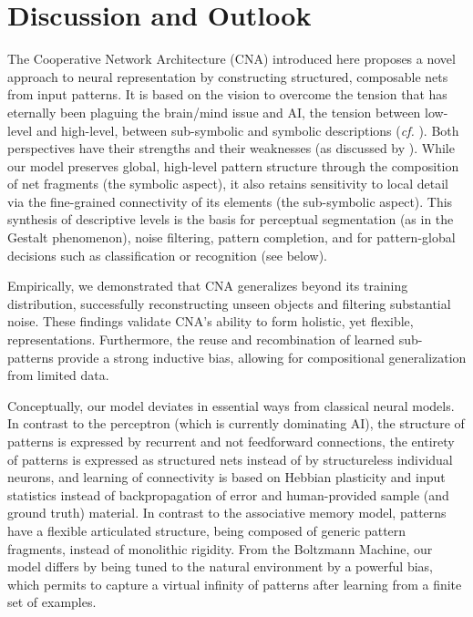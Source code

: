 \documentclass[12pt]{article}
\begin{document}
\section{Discussion and Outlook}\label{sec:discussion}
The Cooperative Network Architecture (CNA) introduced here proposes a novel approach to neural representation by constructing structured, composable nets from input patterns. 
It is based on the vision to overcome the tension that has eternally been plaguing the brain/mind issue and AI, the tension between low-level and high-level, between sub-symbolic and symbolic descriptions ({\it cf.} \cite{FodorPylyshyn}). Both perspectives have their strengths and their weaknesses (as discussed by \citet{Berlin2023}).
While our model preserves global, high-level pattern structure through the composition of net fragments (the symbolic aspect), it also retains sensitivity to local detail via the fine-grained connectivity of its elements (the sub-symbolic aspect). This synthesis of descriptive levels is the basis for perceptual segmentation (as in the Gestalt phenomenon), noise filtering, pattern completion, and for pattern-global decisions such as classification or recognition (see below).

Empirically, we demonstrated that CNA generalizes beyond its training distribution, successfully reconstructing unseen objects and filtering substantial noise. These findings validate CNA’s ability to form holistic, yet flexible, representations. Furthermore, the reuse and recombination of learned sub-patterns provide a strong inductive bias, allowing for compositional generalization from limited data.

Conceptually, our model deviates in essential ways from classical neural models. In contrast to the perceptron (which is currently dominating AI), the structure of patterns is expressed by recurrent and not feedforward connections, the entirety of patterns is expressed as structured nets instead of by structureless individual neurons, and learning of connectivity is based on Hebbian plasticity and input statistics instead of backpropagation of error and human-provided sample (and ground truth) material. In contrast to the associative memory model, patterns have a flexible articulated structure, being composed of generic pattern fragments, instead of monolithic rigidity. From the Boltzmann Machine, our model differs by being tuned to the natural environment by a powerful bias, which permits to capture a virtual infinity of patterns after learning from a finite set of examples.
\end{document}
